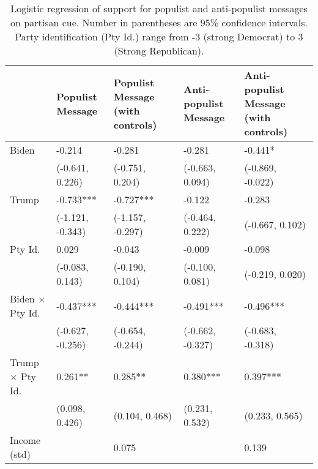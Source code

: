 \begin{table}[th!]
\centering
\caption{Logistic regression of support for populist and anti-populist messages on partisan cue. Number in parentheses are 95\% confidence intervals. Party identification (Pty Id.) range from -3 (strong Democrat) to 3 (Strong Republican).}
\label{tab-estimation-strong-partisans.tex}
\begin{threeparttable}
\begin{tabular}{lC{3cm}C{3cm}C{3cm}C{3cm}}
\toprule
                & Populist Message & Populist Message (with controls) & Anti-populist Message & Anti-populist Message (with controls) \\
\midrule
          Biden &           -0.214 &                           -0.281 &                -0.281 &                               -0.441* \\
                &  (-0.641, 0.226) &                  (-0.751, 0.204) &       (-0.663, 0.094) &                      (-0.869, -0.022) \\
          Trump &        -0.733*** &                        -0.727*** &                -0.122 &                                -0.283 \\
                & (-1.121, -0.343) &                 (-1.157, -0.297) &       (-0.464, 0.222) &                       (-0.667, 0.102) \\
        Pty Id. &            0.029 &                           -0.043 &                -0.009 &                                -0.098 \\
                &  (-0.083, 0.143) &                  (-0.190, 0.104) &       (-0.100, 0.081) &                       (-0.219, 0.020) \\
Biden × Pty Id. &        -0.437*** &                        -0.444*** &             -0.491*** &                             -0.496*** \\
                & (-0.627, -0.256) &                 (-0.654, -0.244) &      (-0.662, -0.327) &                      (-0.683, -0.318) \\
Trump × Pty Id. &          0.261** &                          0.285** &              0.380*** &                              0.397*** \\
                &   (0.098, 0.426) &                   (0.104, 0.468) &        (0.231, 0.532) &                        (0.233, 0.565) \\
   Income (std) &                  &                            0.075 &                       &                                 0.139 \\

\end{tabular}
\end{threeparttable}
\end{table}
